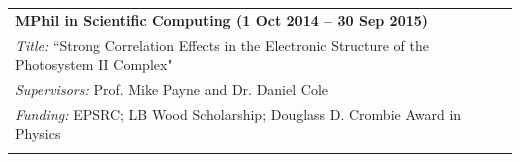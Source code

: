 \documentclass[10pt,a4paper,final]{article}
\begin{document}
\begin{tabularx}{\textwidth}{
   m{\dimexpr\textwidth-2\tabcolsep}}
   \rowcolor{seaborn_bg_grey}
   \textbf{MPhil in Scientific Computing (1 Oct 2014 -- 30 Sep 2015)}
   \\%
   \rowcolor{seaborn_bg_grey}

   \textit{Title:} ``Strong Correlation Effects in the Electronic Structure of the Photosystem II Complex"
   \\
   \rowcolor{seaborn_bg_grey}%

   \textit{Supervisors:} Prof. Mike Payne and Dr. Daniel Cole
   \\
   \rowcolor{seaborn_bg_grey}%

   \textit{Funding:} EPSRC; LB Wood Scholarship; Douglass D. Crombie Award in Physics
   \\
   \rowcolor{seaborn_bg_grey}


\end{tabularx}
\end{document}
